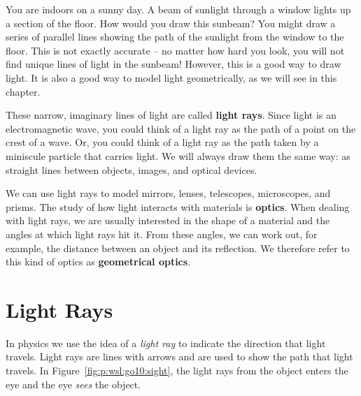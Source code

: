 You are indoors on a sunny day. A beam of sunlight through a window lights up a section of the floor. How would you draw this sunbeam? You might draw a series of parallel lines showing the path of the sunlight from the window to the floor. This is not exactly accurate -- no matter how hard you look, you will not find unique lines of light in the sunbeam! However, this is a good way to draw light. It is also a good way to model light geometrically, as we will see in this chapter.

These narrow, imaginary lines of light are called \textbf{light rays}. Since light is an electromagnetic wave, you could think of a light ray as the path of a point on the crest of a wave. Or, you could think of a light ray as the path taken by a miniscule particle that carries light. We will always draw them the same way: as straight lines between objects, images, and optical devices.

We can use light rays to model mirrors, lenses, telescopes, microscopes, and prisms. The study of how light interacts with materials is \textbf{optics}. When dealing with light rays, we are usually interested in the shape of a material and the angles at which light rays hit it. From these angles, we can work out, for example, the distance between an object and its reflection. We therefore refer to this kind of optics as \textbf{geometrical optics}.

\section{Light Rays}

In physics we use the idea of a \textit{light ray} to indicate the direction that light travels. Light rays are lines with arrows and are used to show the path that light travels. In Figure~\ref{fig:p:wsl:go10:sight}, the light rays from the object enters the eye and the eye \textit{sees} the object.

